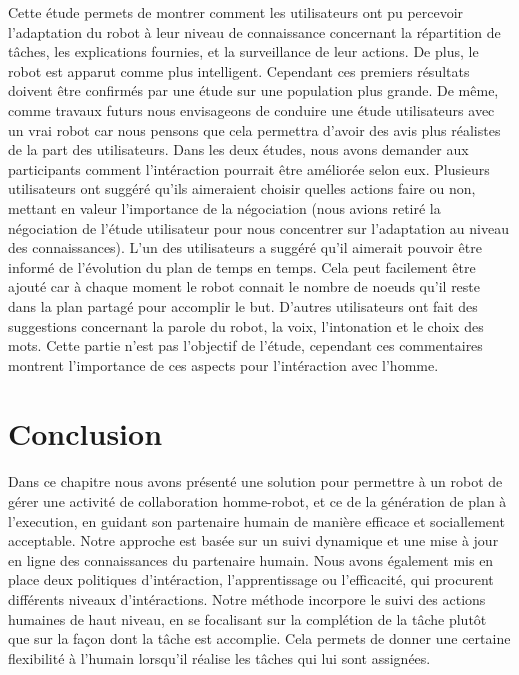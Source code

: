 \documentclass[a4paper,11pt,twoside]{StyleThese}
\begin{document}
Cette étude permets de montrer comment les utilisateurs ont pu percevoir l'adaptation du robot à leur niveau de connaissance concernant la répartition de tâches, les explications fournies, et la surveillance de leur actions. De plus, le robot est apparut comme plus intelligent. Cependant ces premiers résultats doivent être confirmés par une étude sur une population plus grande. De même, comme travaux futurs nous envisageons de conduire une étude utilisateurs avec un vrai robot car nous pensons que cela permettra d'avoir des avis plus réalistes de la part des utilisateurs.
Dans les deux études, nous avons demander aux participants comment l'intéraction pourrait être améliorée selon eux.
Plusieurs utilisateurs ont suggéré qu'ils aimeraient choisir quelles actions faire ou non, mettant en valeur l'importance de la négociation (nous avions retiré la négociation de l'étude utilisateur pour nous concentrer sur l'adaptation au niveau des connaissances). L'un des utilisateurs a suggéré qu'il aimerait pouvoir être informé de l'évolution du plan de temps en temps. 
Cela peut facilement être ajouté car à chaque moment le robot connait le nombre de noeuds qu'il reste dans la plan partagé pour accomplir le but.
D'autres utilisateurs ont fait des suggestions concernant la parole du robot, la voix, l'intonation et le choix des mots. Cette partie n'est pas l'objectif de l'étude, cependant ces commentaires montrent l'importance de ces aspects pour l'intéraction avec l'homme.

%






\section{Conclusion}
Dans ce chapitre nous avons présenté une solution pour permettre à un robot de gérer une activité de collaboration homme-robot, et ce de la génération de plan à l'execution, en guidant son partenaire humain de manière efficace et sociallement acceptable.
Notre approche est basée sur un suivi dynamique et une mise à jour en ligne des connaissances du partenaire humain. 
Nous avons également mis en place deux politiques d'intéraction, l'apprentissage ou l'efficacité, qui procurent différents niveaux d'intéractions. 
Notre méthode incorpore le suivi des actions humaines de haut niveau, en se focalisant sur la complétion de la tâche plutôt que sur la façon dont la tâche est accomplie. Cela permets de donner une certaine flexibilité à l'humain lorsqu'il réalise les tâches qui lui sont assignées.
\end{document}
